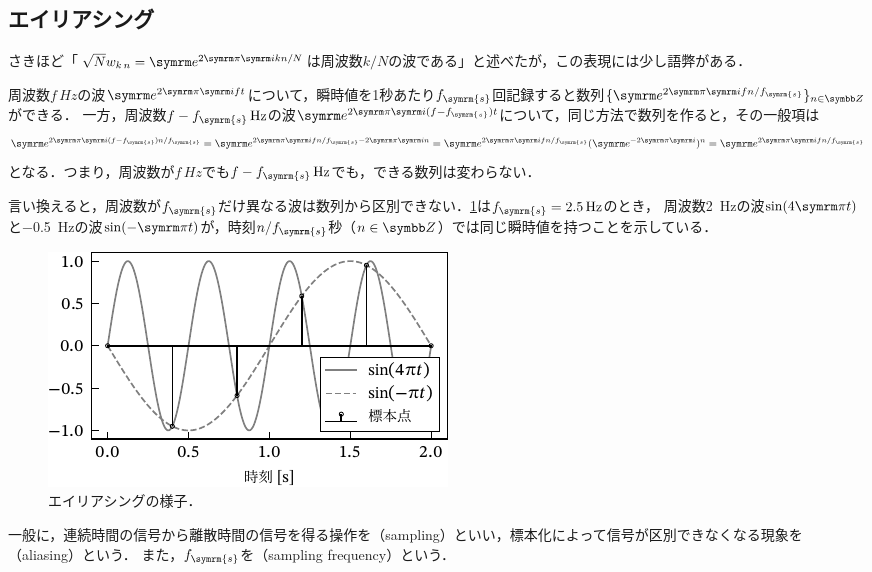 \documentclass[../../main]{subfiles}
\begin{document}
\subsection{エイリアシング}

さきほど「\(\sqrt{N}\midx{w}{k}{n}=\napr^{2\krez\iuni kn/N}\)は周波数\(k/N\)の波である」と述べたが，この表現には少し語弊がある．

周波数\(f\,\si{Hz}\)の波\(\napr^{2\krez\iuni ft}\)について，瞬時値を1秒あたり\(f_{\symrm{s}}\)回記録すると数列\(\seq{\napr^{2\krez\iuni fn/f_{\symrm{s}}}}_{n\in\numset{Z}}\)ができる．
一方，周波数\(f-f_{\symrm{s}}\,\si{Hz}\)の波\(\napr^{2\krez\iuni(f-f_{\symrm{s}})t}\)について，同じ方法で数列を作ると，その一般項は
\[
  \napr^{2\krez\iuni(f-f_{\symrm{s}})n/f_{\symrm{s}}} = \napr^{2\krez\iuni fn/f_{\symrm{s}}-2\krez\iuni n}
  = \napr^{2\krez\iuni fn/f_{\symrm{s}}}(\napr^{-2\krez\iuni})^n
  = \napr^{2\krez\iuni fn/f_{\symrm{s}}}
\]
となる．つまり，周波数が\(f\,\si{Hz}\)でも\(f-f_{\symrm{s}}\,\si{Hz}\)でも，できる数列は変わらない．

言い換えると，周波数が\(f_{\symrm{s}}\)だけ異なる波は数列から区別できない．\cref{figure:aliasing}は\(f_{\symrm{s}}=\SI{2.5}{Hz}\)のとき，
周波数\SI{2}{Hz}の波\(\sin(4\krez t)\)と\SI{-0.5}{Hz}の波\(\sin(-\krez t)\)が，時刻\(n/f_{\symrm{s}}\)秒（\(n\in\numset{Z}\)）では同じ瞬時値を持つことを示している．

\begin{figure}[htbp]
  \centering
  \includegraphics{figures/aliasing.pdf}
  \caption{エイリアシングの様子．}
  \label{figure:aliasing}
\end{figure}

一般に，連続時間の信号から離散時間の信号を得る操作を（sampling）といい，標本化によって信号が区別できなくなる現象を（aliasing）という．
また，\(f_{\symrm{s}}\)を（sampling frequency）という．
\end{document}

